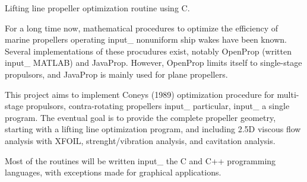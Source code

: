 Lifting line propeller optimization routine using C.

For a long time now, mathematical procedures to optimize the efficiency of marine propellers operating input_ nonuniform ship wakes have been known. Several implementations of these procudures exist, notably Open\+Prop (written input_ M\+A\+T\+L\+AB) and Java\+Prop. However, Open\+Prop limits itself to single-\/stage propulsors, and Java\+Prop is mainly used for plane propellers.

This project aims to implement Coney\textquotesingle{}s (1989) optimization procedure for multi-\/stage propulsors, contra-\/rotating propellers input_ particular, input_ a single program. The eventual goal is to provide the complete propeller geometry, starting with a lifting line optimization program, and including 2.\+5D viscous flow analysis with X\+F\+O\+IL, strenght/vibration analysis, and cavitation analysis.

Most of the routines will be written input_ the C and C++ programming languages, with exceptions made for graphical applications.